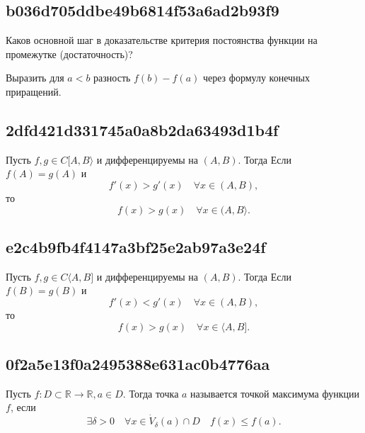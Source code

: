 \documentclass[11pt, a5paper]{article}
\newenvironment{note}[1]{\goodbreak\par\subsection{\hfill \color{lightgray}\tiny #1}}{}
\newenvironment{cloze}[2][\ldots]{\begin{leftbar}}{\end{leftbar}}
\newenvironment{icloze}[2][\ldots]{%
  \ignorespaces\text{\tiny \color{lightgray}\{#2} %
}{%
  \text{\tiny\color{lightgray}\}}\unskip%
}
\begin{document}
\begin{note}{b036d705ddbe49b6814f53a6ad2b93f9}
    Каков основной шаг в доказательстве критерия постоянства функции на промежутке (достаточность)?

    \begin{cloze}{1}
        Выразить для \( a < b \) разность \( f(b) - f(a) \) через формулу конечных приращений.
    \end{cloze}
\end{note}

\begin{note}{2dfd421d331745a0a8b2da63493d1b4f}
    Пусть \begin{icloze}{3}\( f, g \in C[A, B\rangle \) и дифференцируемы на \( (A,  B) \).\end{icloze} Тогда
    Если \begin{icloze}{2}\( f(A) = g(A) \) и
        \[
            f'(x) > g'(x) \quad \forall x \in (A, B),
        \]
    \end{icloze}    то
    \begin{icloze}{1}\[
        f(x) > g(x) \quad \forall x \in (A, B\rangle.
    \]\end{icloze}
\end{note}

\begin{note}{e2c4b9fb4f4147a3bf25e2ab97a3e24f}
    Пусть \begin{icloze}{3}\( f, g \in C \langle A, B] \) и дифференцируемы на \( (A,  B) \).\end{icloze} Тогда
    Если \begin{icloze}{2}\( f(B) = g(B) \) и
        \[
            f'(x) < g'(x) \quad \forall x \in (A, B),
        \]
    \end{icloze}    то
    \begin{icloze}{1}\[
        f(x) > g(x) \quad \forall x \in \langle A, B].
    \]\end{icloze}
\end{note}

\begin{note}{0f2a5e13f0a2495388e631ac0b4776aa}
    Пусть \( f : D \subset \mathbb R \to \mathbb R, a \in D \). Тогда точка \( a \) называется \begin{icloze}{2}точкой максимума функции \( f \),\end{icloze} если
    \begin{icloze}{1}\[
                         \exists \delta > 0 \quad \forall x \in \dot V_{\delta} (a) \cap D \quad f(x) \leqslant f(a).
                     \]\end{icloze}
\end{note}
\end{document}
